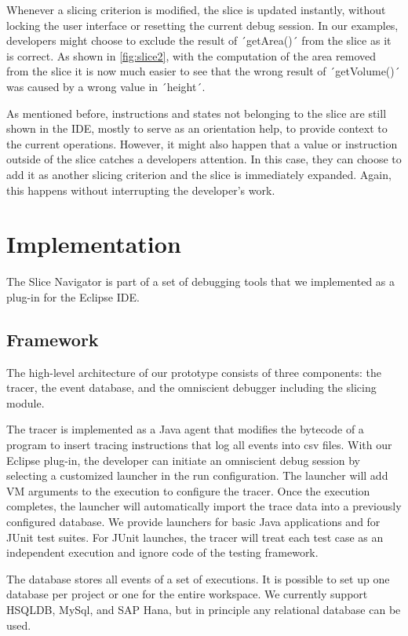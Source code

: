 ﻿\documentclass[
      english,
			conference,
      ]{IEEEtran}
\begin{document}
Whenever a slicing criterion is modified, the slice is updated instantly, without locking the user interface or resetting the current debug session.
In our examples, developers might choose to exclude the result of ´getArea()´ from the slice as it is correct.
As shown in \cref{fig:slice2}, with the computation of the area removed from the slice it is now much easier to see that the wrong result of ´getVolume()´ was caused by a wrong value in ´height´.

As mentioned before, instructions and states not belonging to the slice are still shown in the IDE, mostly to serve as an orientation help, to provide context to the current operations.
However, it might also happen that a value or instruction outside of the slice catches a developers attention.
In this case, they can choose to add it as another slicing criterion and the slice is immediately expanded.
Again, this happens without interrupting the developer's work.

\section{Implementation}
\label{sec:impl}

The Slice Navigator is part of a set of debugging tools that we implemented as a plug-in for the Eclipse IDE.

\subsection{Framework}

The high-level architecture of our prototype consists of three components: the tracer, the event database, and the omniscient debugger including the slicing module.

The tracer is implemented as a Java agent that modifies the bytecode of a program to insert tracing instructions that log all events into csv files.
With our Eclipse plug-in, the developer can initiate an omniscient debug session by selecting a customized launcher in the run configuration.
The launcher will add VM arguments to the execution to configure the tracer.
Once the execution completes, the launcher will automatically import the trace data into a previously configured database.
We provide launchers for basic Java applications and for JUnit test suites.
For JUnit launches, the tracer will treat each test case as an independent execution and ignore code of the testing framework.

The database stores all events of a set of executions.
It is possible to set up one database per project or one for the entire workspace.
We currently support HSQLDB, MySql, and SAP Hana, but in principle any relational database can be used.
\end{document}
